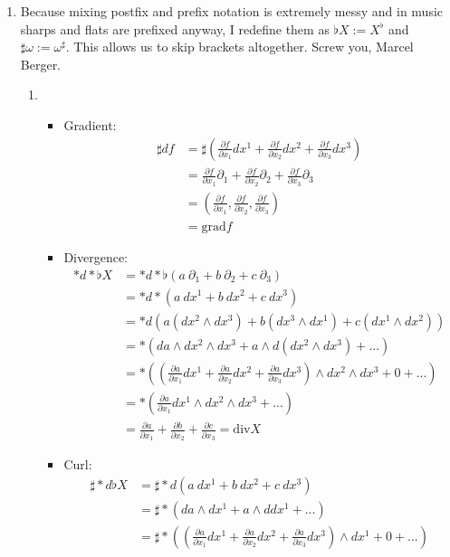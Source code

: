 \documentclass[a4paper,11pt,notitlepage,fullpage]{article}
\begin{document}
\begin{enumerate}
\item Because mixing postfix and prefix notation is extremely messy and in music sharps and flats are prefixed anyway, I redefine them as $\flat X := X^\flat$ and $\sharp \omega := \omega^\sharp$. This allows us to skip brackets altogether. Screw you, Marcel Berger.
\begin{enumerate}
\item
\begin{itemize}
\item Gradient:
\begin{align*}
\sharp df &= \sharp(\frac{\partial f}{\partial x_1} dx^1 + \frac{\partial f}{\partial x_2} dx^2 + \frac{\partial f}{\partial x_3} dx^3) \\
&= \frac{\partial f}{\partial x_1} \partial_1 + \frac{\partial f}{\partial x_2} \partial_2 + \frac{\partial f}{\partial x_3} \partial_3 \\
&= (\frac{\partial f}{\partial x_1}, \frac{\partial f}{\partial x_2}, \frac{\partial f}{\partial x_3}) \\
&= \text{grad} f
\end{align*}
\item Divergence:
\begin{align*}
{\ast}d{\ast}\flat X &= {\ast}d{\ast}\flat (a~\partial_1 + b~\partial_2 + c~\partial_3) \\
&= {\ast}d{\ast} (a~dx^1 + b~dx^2 + c~dx^3) \\
&= {\ast}d(a(dx^2\wedge dx^3) + b(dx^3\wedge dx^1) + c(dx^1\wedge dx^2)) \\
&= {\ast}( da \wedge dx^2 \wedge dx^3 + a \wedge d(dx^2 \wedge dx^3) + ...) \\
&= {\ast}((\frac{\partial a}{\partial x_1} dx^1 + \frac{\partial a}{\partial x_2} dx^2 + \frac{\partial a}{\partial x_3} dx^3) \wedge dx^2 \wedge dx^3 + 0 + ... )\\
&= {\ast}(\frac{\partial a}{\partial x_1} dx^1 \wedge dx^2 \wedge dx^3 + ...) \\
&= \frac{\partial a}{\partial x_1} + \frac{\partial b}{\partial x_2} + \frac{\partial c}{\partial x_3} = \text{div} X
\end{align*}
\item Curl:
\begin{align*}
\sharp{\ast}d\flat X &= \sharp{\ast}d(a~dx^1 + b~dx^2 + c~dx^3) \\
&= \sharp{\ast}(da \wedge dx^1 + a \wedge ddx^1 + ...) \\
&= \sharp{\ast}((\frac{\partial a}{\partial x_1} dx^1 + \frac{\partial a}{\partial x_2} dx^2 + \frac{\partial a}{\partial x_3} dx^3) \wedge dx^1 + 0 + ...) \\

\end{align*}
\end{itemize}
\end{enumerate}
\end{enumerate}
\end{document}

